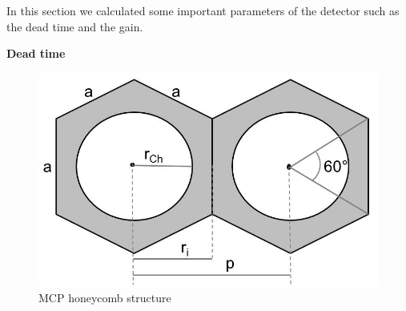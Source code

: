 		In this section we calculated some important parameters of the detector such as the dead time and the gain. %
		
		\textbf{Dead time}\\
		
		\begin{figure}[h]
			\centering
			\includegraphics[width=.4\textwidth]{Bilder/MCP_hex.jpg}
			\caption{MCP honeycomb structure}
			\label{fig:MCPhex} %
		\end{figure}
		
